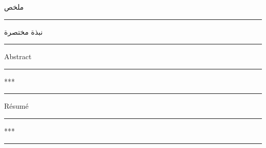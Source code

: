 \documentclass[12pt]{article}
\begin{document}
\begin{Arabic}
ملخص
\end{Arabic}
\medskip
\hrule\smallskip
\begin{Arabic} %
نبذة مختصرة
\end{Arabic}
\hrule



\vspace{0.5cm}

Abstract\smallskip
\hrule\smallskip
***
\hrule

\vspace{0.5cm}

Résumé\medskip
\hrule\smallskip
***
\hrule
\end{document}
